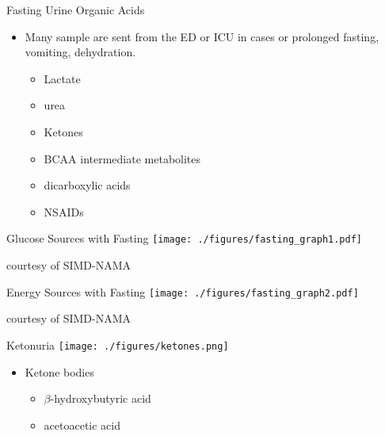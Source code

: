 \documentclass[presentation, smaller]{beamer}
\begin{document}
\begin{frame}[label={sec:orgheadline2}]{Fasting Urine Organic Acids}
\begin{itemize}
\item Many sample are sent from the ED or ICU in cases or prolonged
fasting, vomiting, dehydration.
\begin{itemize}
\item Lactate
\item urea
\item Ketones
\item BCAA intermediate metabolites
\item dicarboxylic acids
\item NSAIDs
\end{itemize}
\end{itemize}
\end{frame}

\begin{frame}[label={sec:orgheadline3}]{Glucose Sources with Fasting}
\texttt{[image: ./figures/fasting\_graph1.pdf]}

\tiny
courtesy of SIMD-NAMA
\end{frame}

\begin{frame}[label={sec:orgheadline4}]{Energy Sources with Fasting}
\texttt{[image: ./figures/fasting\_graph2.pdf]}

\tiny
courtesy of SIMD-NAMA
\end{frame}

\begin{frame}[label={sec:orgheadline5}]{Ketonuria}
\texttt{[image: ./figures/ketones.png]}

\begin{itemize}
\item Ketone bodies
\begin{itemize}
\item \(\beta\)-hydroxybutyric acid
\item acetoacetic acid
\end{itemize}
\end{itemize}
\end{frame}
\end{document}

